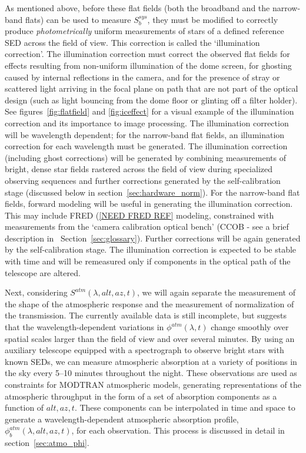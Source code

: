 \documentclass[12pt,preprint]{aastex}
\begin{document}
As mentioned above, before these flat fields (both the
broadband and the narrow-band flats) can be used to measure
$S_b^{sys}$, they must be modified to correctly produce {\it
photometrically} uniform measurements of stars of a defined reference
SED across the field of view. This correction is called the
`illumination correction'.  The illumination correction must correct
the observed flat fields for effects resulting from non-uniform
illumination of the dome screen, for ghosting caused by internal
reflections in the camera, and for the presence of stray or scattered
light arriving in the focal plane on path that are not part of the
optical design (such as light bouncing from the dome floor or glinting
off a filter holder). See figures~\ref{fig:flatfield} and
\ref{fig:iceffect} for a visual example of the illumination correction
and its importance to image processing. The illumination correction
will be wavelength dependent; for the narrow-band flat fields, an
illumination correction for each wavelength must be generated.  The
illumination correction (including ghost corrections) will be
generated by combining measurements of bright, dense star fields
rastered across the field of view during specialized observing
sequences and further corrections generated by the self-calibration
stage (discussed below in section~\ref{sec:hardware_norm}). For the
narrow-band flat fields, forward modeling will be useful in generating
the illumination correction. This may include FRED (\ref{NEED FRED REF} modeling,
constrained with measurements from the `camera calibration optical
bench' (CCOB - see a brief description in ~Section~\ref{sec:glossary}).
Further corrections will
be again generated by the self-calibration stage.  The illumination correction is
expected to be stable with time and will be remeasured only if components in the
optical path of the telescope are altered.

Next, considering $S^{atm}(\lambda,alt,az,t)$, we will again separate
the measurement of the shape of the atmospheric response and the
measurement of normalization of the transmission.  The currently
available data is still incomplete, but suggests that the
wavelength-dependent variations in $\phi^{atm}(\lambda,t)$ change
smoothly over spatial scales larger than the field of view and over
several minutes.  By using an auxiliary telescope equipped with a
spectrograph to observe bright stars with known SEDs, we can measure
atmospheric absorption at a variety of positions in the sky every
5--10 minutes throughout the night. These observations are used as
constraints for MODTRAN atmospheric models, generating representations
of the atmospheric throughput in the form of a set of absorption
components as a function of $alt,az,t$. These components can be
interpolated in time and space to generate a wavelength-dependent
atmospheric absorption profile, $\phi_b^{atm}(\lambda,alt,az,t)$, for
each observation. This process is discussed in detail in
section~\ref{sec:atmo_phi}.  
\end{document}
